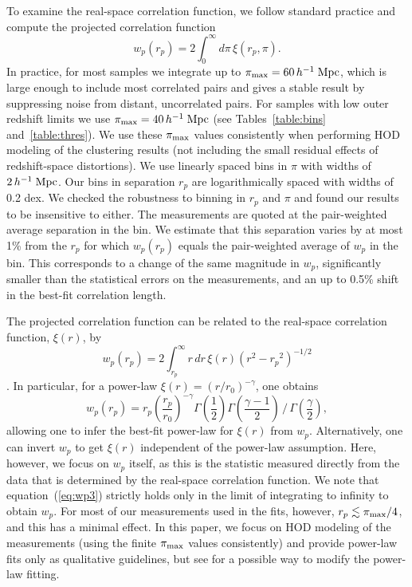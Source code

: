 \documentclass[]{emulateapj}
\newcommand{\hmpc}{\,h^{-1}\;{\rm Mpc}}
\newcommand{\xir}{{\xi(r)}}
\begin{document}
To examine the real-space correlation function, we follow standard 
practice and compute the projected correlation function
\begin{equation}
w_p(r_p) = 2 \int_0^{\infty} d\pi \, \xi(r_p,\pi). 
\label{eq:wp}
\end{equation}
In practice, for most samples we integrate up to $\pi_{\rm max} =60\hmpc$, 
which is large enough to include most correlated pairs and gives a stable 
result by suppressing noise from distant, uncorrelated pairs.
For samples with low outer redshift limits we
use $\pi_{\rm max} = 40\hmpc$ (see Tables~\ref{table:bins}
and~\ref{table:thres}).
We use these $\pi_{\rm max}$ values consistently when performing
HOD modeling of the clustering results (not including the small 
residual effects of redshift-space distortions).
We use linearly spaced bins in $\pi$ with widths of $2\hmpc$.
Our bins in separation $r_p$ are logarithmically spaced with widths of
0.2 dex. We checked the robustness to binning in $r_p$ 
and $\pi$ and found our results to be insensitive to either.
The measurements are quoted at the pair-weighted average separation in 
the bin. We estimate that this separation 
varies by at most 1\% from the $r_p$ for which $w_p(r_p)$ equals the
pair-weighted average of $w_p$ in the bin. This corresponds to a  
change of the same magnitude in $w_p$, significantly smaller than the 
statistical errors on the measurements, and an up to 0.5\% shift in 
the best-fit correlation length. 

The projected correlation function can be related to the
real-space correlation function, $\xir$, by
\begin{equation}
w_p(r_p) 
= 2 \int_{r_p}^{\infty} r\, dr\, \xir  (r^2-{r_p}^2)^{-1/2}
\label{eq:wp2}
\end{equation}
\citep{davis83}.  In particular, for a power-law 
$\xi(r) = (r/r_0)^{-\gamma}$,  one obtains 
\begin{equation}
w_p(r_p) = r_p \left(\frac{r_p}{r_0}\right)^{-\gamma} 
           \Gamma\left(\frac{1}{2}\right) 
           \Gamma\left(\frac{\gamma-1}{2}\right)\,
          \Bigr/ \,\Gamma\left(\frac{\gamma}{2}\right),
\label{eq:wp3}
\end{equation}
allowing one to infer the best-fit power-law for $\xir$ from $w_p$.
Alternatively, one can invert $w_p$ to get $\xir$ independent of 
the power-law assumption.  
Here, however, we focus on $w_p$ itself, as this is the statistic
measured directly from the data that
is determined by the real-space correlation function.
We note that equation~(\ref{eq:wp3}) strictly holds only in the limit of 
integrating to infinity to obtain $w_p$. For most of our measurements 
used in the fits, however, 
$r_p \lesssim \pi_{\rm max}/4$, and this has a minimal effect. 
In this paper, we focus on HOD modeling of the measurements (using
the finite  $\pi_{\rm max}$ values consistently) and provide power-law fits 
only as qualitative guidelines, but see \citet{coil07} for a possible way 
to modify the power-law fitting. 
\end{document}
